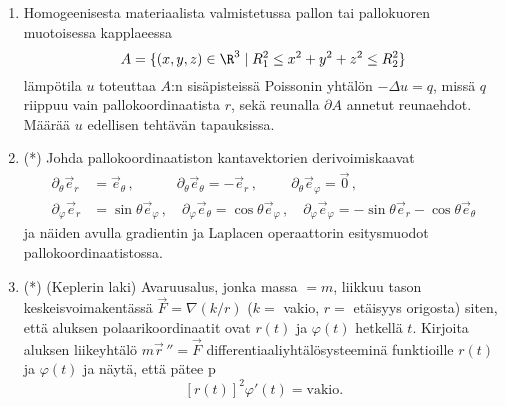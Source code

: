 \begin{enumerate}
\item 
Homogeenisesta materiaalista valmistetussa pallon tai pallokuoren muotoisessa kapplaeessa
\[
A = \{(x,y,z)\in\R^3 \mid R_1^2 \le x^2 + y^2 + z^2 \le R_2^2 \}
\]
lämpötila $u$ toteuttaa $A$:n sisäpisteissä Poissonin yhtälön $-\Delta u=q$, missä $q$ riippuu
vain pallokoordinaatista $r$, sekä reunalla $\partial A$ annetut reunaehdot. Määrää $u$ 
edellisen tehtävän tapauksissa.

\item (*)
Johda pallokoordinaatiston kantavektorien derivoimiskaavat
\begin{align*}
\partial_\theta\vec e_r  &= \vec e_\theta\,, \qquad\quad 
                            \partial_\theta\vec e_\theta=-\vec e_r\,, \qquad\,\
                            \partial_\theta\vec e_\varphi=\vec 0\,, \\
\partial_\varphi\vec e_r &= \sin\theta\vec e_\varphi\,, \quad
                            \partial_\varphi\vec e_\theta=\cos\theta\vec e_\varphi\,, \quad
                            \partial_\varphi\vec e_\varphi=-\sin\theta\vec e_r-\cos\theta\vec e_\theta 
\end{align*}
ja näiden avulla gradientin ja Laplacen operaattorin esitysmuodot pallokoordinaatistossa.

\item (*) 
(Keplerin laki) Avaruusalus, jonka massa $=m$, liikkuu tason keskeisvoimakentässä
$\vec F=\nabla(k/r)$ ($k=$ vakio, $r=$ etäisyys origosta) siten, että aluksen
polaarikoordinaatit ovat $r(t)$ ja $\varphi(t)$ hetkellä $t$. Kirjoita aluksen liikeyhtälö
$m\vec r\,''=\vec F$ differentiaaliyhtälösysteeminä funktioille $r(t)$ ja $\varphi(t)$ ja
näytä, että pätee \pain{Ke}p\pain{lerin} \pain{toinen} \pain{laki}
\[
[r(t)]^2\varphi'(t)=\text{vakio}.
\]

\end{enumerate}